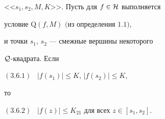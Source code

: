\begin{lems}


<<$s_1, s_2, M, K$>>. Пусть для $f\in {\cal H}$ выполняется 


условие $\mathrm Q(f,M)$ $($из определения $1.1)$,


и точки $s_1$, $s_2$ --- смежные вершины некоторого 


${\cal Q}$-квадрата. Если 





$(3.6.1)$ \ $|f(s_1)|\leq K$, $|f(s_2)| \leq K$,





\noindent{}то





$(3.6.2)$ \ $|f(z)| \leq K_{21}$ для всех $z\in [s_1, s_2]$.


\end{lems}





